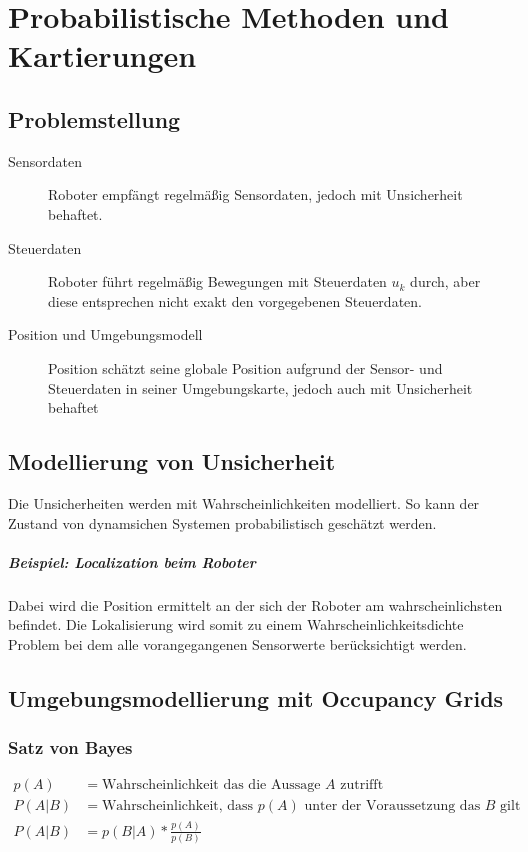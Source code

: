 \chapter{Probabilistische Methoden und Kartierungen}
\section{Problemstellung}

\begin{description}
	\item[Sensordaten] Roboter empfängt regelmäßig Sensordaten, jedoch mit
		Unsicherheit behaftet.
	\item[Steuerdaten] Roboter führt regelmäßig Bewegungen mit Steuerdaten $u_k$
		durch, aber diese entsprechen nicht exakt den vorgegebenen Steuerdaten.
	\item[Position und Umgebungsmodell] Position schätzt seine globale Position
		aufgrund der Sensor- und Steuerdaten in seiner Umgebungskarte, jedoch auch
		mit Unsicherheit behaftet
\end{description}

\section{Modellierung von Unsicherheit}
Die Unsicherheiten werden mit Wahrscheinlichkeiten modelliert. So kann der
Zustand von dynamsichen Systemen probabilistisch geschätzt werden.

\paragraph{Beispiel: Localization beim Roboter}
Dabei wird die Position ermittelt an der sich der Roboter am
wahrscheinlichsten befindet. Die Lokalisierung wird somit zu einem
Wahrscheinlichkeitsdichte Problem bei dem alle vorangegangenen Sensorwerte
berücksichtigt werden.

\section{Umgebungsmodellierung mit Occupancy Grids}
\subsection{Satz von Bayes}
\begin{align*}
	p(A) &= \text{Wahrscheinlichkeit das die Aussage } A \text{ zutrifft} \\
	P(A|B) &= \text{Wahrscheinlichkeit, dass } p(A) \text{ unter der
									Voraussetzung das }B\text{ gilt} \\
  P(A|B) &= p(B|A) * \frac{p(A)}{p(B)}
\end{align*}

